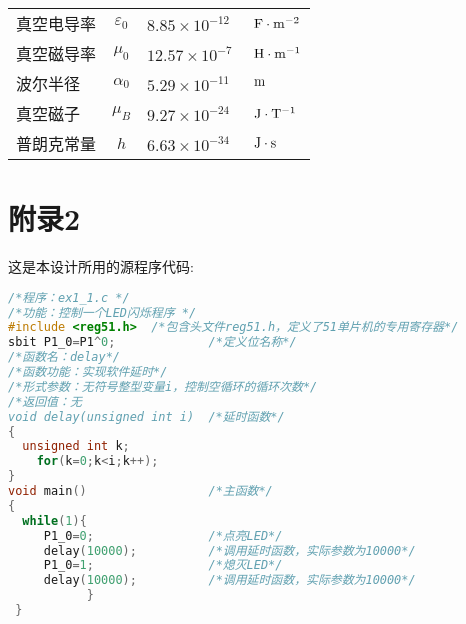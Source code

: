 \begin{table}[ht]
\begin{tabular}{lcll}
      真空电导率 & $\varepsilon _0$ & $8.85\times10^{-12}$ & $\rm~ F\cdot m^{-2}$\\
      
      真空磁导率 & $\mu _0$ & $12.57\times10^{-7}$ & $\rm~ H\cdot m^{-1}$\\
      
      波尔半径 & $\alpha _0$ & $5.29\times10^{-11}$ & $\rm~ m$\\
      
      真空磁子 & $\mu _B$ & $9.27\times10^{-24}$ & $\rm~ J\cdot T^{-1}$\\
      
      普朗克常量 & $h$ & $6.63\times10^{-34}$ & $\rm~ J\cdot s$\\
    \bottomrule
    \end{tabular}
\end{table}

\newpage
\section{附录2} 


这是本设计所用的源程序代码:

\begin{lstlisting}[language={C}, caption={}]
/*程序：ex1_1.c */
/*功能：控制一个LED闪烁程序 */
#include <reg51.h>  /*包含头文件reg51.h，定义了51单片机的专用寄存器*/
sbit P1_0=P1^0;          	/*定义位名称*/
/*函数名：delay*/
/*函数功能：实现软件延时*/
/*形式参数：无符号整型变量i，控制空循环的循环次数*/
/*返回值：无
void delay(unsigned int i) 	/*延时函数*/
{
  unsigned int k;
	for(k=0;k<i;k++);
}
void main()                	/*主函数*/
{
  while(1){
     P1_0=0;				/*点亮LED*/
     delay(10000);			/*调用延时函数，实际参数为10000*/
     P1_0=1;				/*熄灭LED*/
     delay(10000);			/*调用延时函数，实际参数为10000*/
           }
 }

\end{lstlisting}
